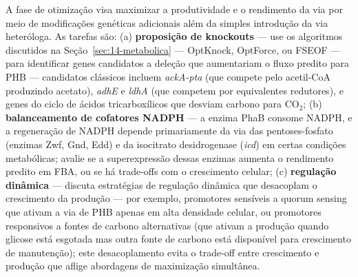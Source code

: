\begin{exercicio}
A fase de otimização visa maximizar a produtividade e o rendimento da via por meio de modificações genéticas adicionais além da simples introdução da via heteróloga. As tarefas são: (a) \textbf{proposição de knockouts} --- use os algoritmos discutidos na Seção~\ref{sec:14-metabolica} --- OptKnock, OptForce, ou FSEOF --- para identificar genes candidatos a deleção que aumentariam o fluxo predito para PHB --- candidatos clássicos incluem \textit{ackA-pta} (que compete pelo acetil-CoA produzindo acetato), \textit{adhE} e \textit{ldhA} (que competem por equivalentes redutores), e genes do ciclo de ácidos tricarboxílicos que desviam carbono para CO$_2$; (b) \textbf{balanceamento de cofatores NADPH} --- a enzima PhaB consome NADPH, e a regeneração de NADPH depende primariamente da via das pentoses-fosfato (enzimas Zwf, Gnd, Edd) e da isocitrato desidrogenase (\textit{icd}) em certas condições metabólicas; avalie se a superexpressão dessas enzimas aumenta o rendimento predito em FBA, ou se há trade-offs com o crescimento celular; (c) \textbf{regulação dinâmica} --- discuta estratégias de regulação dinâmica que desacoplam o crescimento da produção --- por exemplo, promotores sensíveis a quorum sensing que ativam a via de PHB apenas em alta densidade celular, ou promotores responsivos a fontes de carbono alternativas (que ativam a produção quando glicose está esgotada mas outra fonte de carbono está disponível para crescimento de manutenção); este desacoplamento evita o trade-off entre crescimento e produção que aflige abordagens de maximização simultânea.
\end{exercicio}

